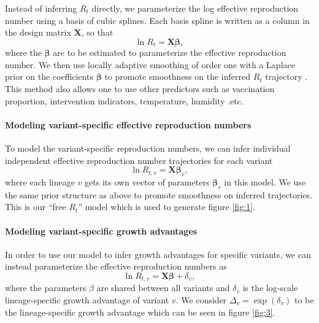 \documentclass[11pt,oneside,letterpaper]{article}
\renewcommand{\vec}[1]{\boldsymbol{#1}}
\begin{document}
Instead of inferring $R_{t}$ directly, we parameterize the log effective reproduction number using a basis of cubic splines.
Each basis spline is written as a column in the design matrix $\vec{X}$, so that
\begin{equation}
  \ln R_{t} = \vec{X} \vec{\beta},
\end{equation}
where the $\vec{\beta}$ are to be estimated to parameterize the effective reproduction number.
We then use locally adaptive smoothing of order one with a Laplace prior on the coefficients $\vec{\beta}$ to promote smoothness on the inferred $R_t$ trajectory \cite{Faulkner2018}.
This method also allows one to use other predictors such as vaccination proportion, intervention indicators, temperature, humidity .etc.

\paragraph{Modeling variant-specific effective reproduction numbers}%

To model the variant-specific reproduction numbers, we can infer individual independent effective reproduction number trajectories for each variant
\begin{equation}
  \ln R_{t, v} = \vec{X} \vec{\beta}_{v},
\end{equation}
where each lineage $v$ gets its own vector of parameters $\vec{\beta}_{v}$ in this model.
We use the same prior structure as above to promote smoothness on inferred trajectories. This is our ``free $R_{t}$'' model which is used to generate figure \ref{fig:1}.

\paragraph{Modeling variant-specific growth advantages}%

In order to use our model to infer growth advantages for specific variants, we can instead parameterize the effective reproduction numbers as
\begin{equation}
\ln R_{t,v} = \vec{X} \vec{\beta} + \delta_{v},
\end{equation}
where the parameters $\beta$ are shared between all variants and $\delta_{v}$ is the log-scale lineage-specific growth advantage of variant $v$.
We consider $\Delta_{v} = \exp(\delta_{v})$ to be the lineage-specific growth advantage which can be seen in figure \ref{fig:3}.
\end{document}
